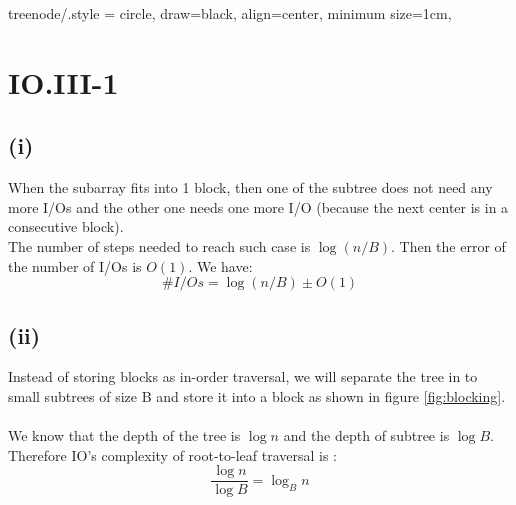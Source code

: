 
\tikzset
{
    treenode/.style = {circle, draw=black, align=center, minimum size=1cm},
}

\section*{IO.III-1}

\subsection*{(i)}
When the subarray fits into 1 block, then one of the subtree does not need any more I/Os and the other one needs one more I/O (because the next center is in a consecutive block).\\ 

The number of steps needed to reach such case is $\log(n/B)$. Then the error of the number of I/Os is $O(1)$. We have:
$$\#I/Os = \log(n/B) \pm O(1)$$

\subsection*{(ii)}
Instead of storing blocks as in-order traversal, we will separate the tree in to small subtrees of size B and store it into a block as shown in figure \ref{fig:blocking}.
\\\\
We know that the depth of the tree is $\log n$ and the depth of subtree is $\log B$. Therefore IO's complexity of root-to-leaf traversal is :
$$\frac{\log n}{\log B} = \log_{B} n$$

